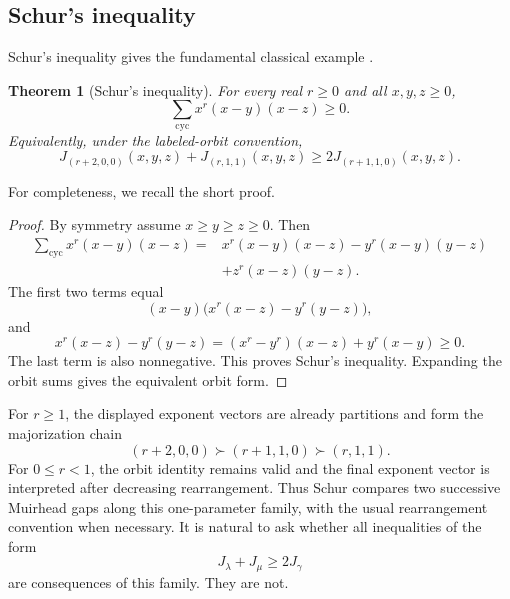 \documentclass[11pt]{article}
\newtheorem{theorem}{Theorem}[section]
\theoremstyle{definition}
\begin{document}
\subsection{Schur's inequality}

Schur's inequality gives the fundamental classical example \cite{Schur1923}.

\begin{theorem}[Schur's inequality]\label{thm:schur}
For every real \(r\ge0\) and all \(x,y,z\ge0\),
\begin{equation*}
\sum_{\mathrm{cyc}}x^r(x-y)(x-z)\ge0.
\end{equation*}
Equivalently, under the labeled-orbit convention,
\begin{equation*}
J_{(r+2,0,0)}(x,y,z)
+J_{(r,1,1)}(x,y,z)
\ge
2J_{(r+1,1,0)}(x,y,z).
\end{equation*}
\end{theorem}

For completeness, we recall the short proof.

\begin{proof}
By symmetry assume \(x\ge y\ge z\ge0\).  Then
\begin{align*}
\sum_{\mathrm{cyc}}x^r(x-y)(x-z)
={}&x^r(x-y)(x-z)-y^r(x-y)(y-z)\\
&+z^r(x-z)(y-z).
\end{align*}
The first two terms equal
\begin{equation*}
(x-y)\bigl(x^r(x-z)-y^r(y-z)\bigr),
\end{equation*}
and
\begin{equation*}
x^r(x-z)-y^r(y-z)
=(x^r-y^r)(x-z)+y^r(x-y)\ge0.
\end{equation*}
The last term is also nonnegative.  This proves Schur's inequality.  Expanding the orbit sums gives the equivalent orbit form.
\end{proof}

For \(r\ge1\), the displayed exponent vectors are already partitions and form the majorization chain
\begin{equation*}
(r+2,0,0)
\succ
(r+1,1,0)
\succ
(r,1,1).
\end{equation*}
For \(0\le r<1\), the orbit identity remains valid and the final exponent vector is interpreted after decreasing rearrangement.  Thus Schur compares two successive Muirhead gaps along this one-parameter family, with the usual rearrangement convention when necessary.  It is natural to ask whether all inequalities of the form
\begin{equation*}
J_\lambda+J_\mu\ge2J_\gamma
\end{equation*}
are consequences of this family.  They are not.
\end{document}
